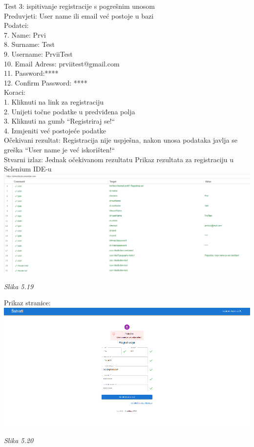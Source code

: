 \documentclass{article}
\begin{document}
	Test 3: ispitivanje registracije s pogrešnim unosom\\
	Preduvjeti: User name ili email već postoje u bazi\\
	Podatci: \\
	7.	Name: Prvi \\
	8.	Surname: Test\\
	9.	Username: PrviiTest\\
	10.	Email Adress: prviitest@gmail.com\\
	11.	Password:****\\
	12.	Confirm Password: ****\\
	Koraci:\\
	1. Kliknuti na link za registraciju\\
	2. Unijeti točne podatke u predviđena polja\\
	3. Kliknuti na gumb “Registriraj se!“\\
	4. Izmjeniti već postojeće podatke\\
	
	Očekivani rezultat: Registracija nije uspješna, nakon unosa podataka javlja se greška “User name je već iskorišten!“ \\
	Stvarni izlaz: Jednak očekivanom rezultatu
	Prikaz rezultata za registraciju u Selenium IDE-u\\
	
	\includegraphics[width=\columnwidth]{registracija-greska}
	\begin{center}
		\textit{Slika 5.19}
	\end{center}
	\eject
	Prikaz stranice:\\
	
	\includegraphics[width=\columnwidth]{reg-greska}
	\begin{center}
		\textit{Slika 5.20}
	\end{center}
	\eject
	
\end{document}
